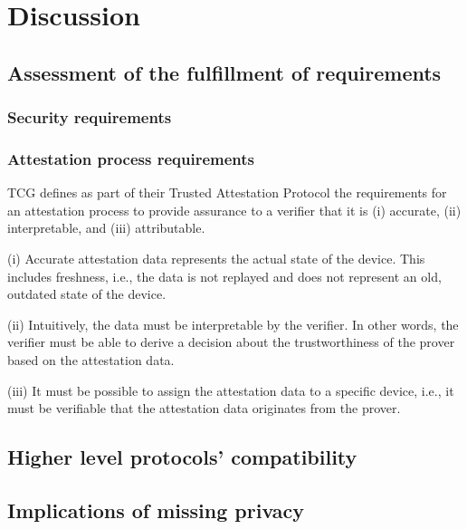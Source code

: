 
\chapter{Discussion}\label{chapter:discussion}

\section{Assessment of the fulfillment of requirements}

\subsection{Security requirements}

\subsection{Attestation process requirements}


\ac{TCG} defines as part of their Trusted Attestation Protocol \cite{tap} the requirements for an attestation process to provide assurance to a verifier that it is (i) accurate, (ii) interpretable, and (iii) attributable.

(i) Accurate attestation data represents the actual state of the device.
This includes freshness, i.e., the data is not replayed and does not represent an old, outdated state of the device.

(ii) Intuitively, the data must be interpretable by the verifier.
In other words, the verifier must be able to derive a decision about the trustworthiness of the prover based on the attestation data.

(iii) It must be possible to assign the attestation data to a specific device, i.e., it must be verifiable that the attestation data originates from the prover.


\section{Higher level protocols' compatibility}

\section{Implications of missing privacy}

